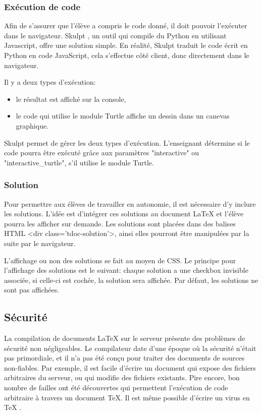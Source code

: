 \documentclass[12pt,titlepage,oneside]{article}
\renewcommand{\footnote}[1]{}
\renewcommand{\cite}[1]{}
\begin{document}
\subsubsection{Exécution de code}
Afin de s'assurer que l'élève a compris le code donné, il doit pouvoir l'exécuter dans le navigateur. Skulpt \cite{skulpt}, un outil qui compile du Python en utilisant Javascript, offre une solution simple. En réalité, Skulpt traduit le code écrit en Python en code JavaScript, cela s'effectue côté client, donc directement dans le navigateur. \par
Il y a deux types d'exécution:
\begin{itemize}
\item le résultat est affiché sur la console,
\item le code qui utilise le module Turtle affiche un dessin dans un canevas graphique.
\end{itemize}
Skulpt permet de gérer les deux types d'exécution. L'enseignant détermine si le code pourra être exécuté grâce aux paramètres "interactive" ou "interactive\_turtle", s'il utilise le module Turtle.\par

\newpage
\subsubsection{Solution}
Pour permettre aux élèves de travailler en autonomie, il est nécessaire d'y inclure les solutions. L'idée est d'intégrer ces solutions au document LaTeX et l'élève pourra les afficher sur demande. Les solutions sont placées dans des balises HTML <div class='tdoc-solution'>, ainsi elles pourront être manipulées par la suite par le navigateur.\par

L'affichage ou non des solutions se fait au moyen de CSS. Le principe pour l'affichage des solutions est le suivant: chaque solution a une checkbox invisible associée, si celle-ci est cochée, la solution sera affichée. Par défaut, les solutions ne sont pas affichées.\par

\subsection{Sécurité}
La compilation de documents LaTeX sur le serveur présente des problèmes de sécurité non négligeables. Le compilateur date d'une époque où la sécurité n'était pas primordiale, et il n'a pas été conçu pour traiter des documents de sources non-fiables. Par exemple, il est facile d'écrire un document qui expose des fichiers arbitraires du serveur, ou qui modifie des fichiers existants. Pire encore, bon nombre de failles ont été découvertes qui permettent l'exécution de code arbitraire à travers un document TeX. \footnote{Exemples \url{https://nvd.nist.gov/vuln/detail/CVE-2016-10243}, \url{https://nvd.nist.gov/vuln/detail/CVE-2018-17407}} Il est même possible d'écrire un virus en TeX \cite{usenix}.\par
\end{document}

